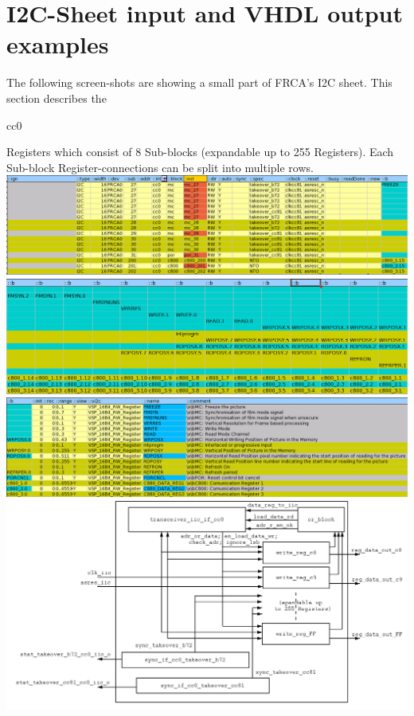 \documentclass[a4paper,12pt]{report}
\begin{document}
\section{I2C-Sheet input and VHDL output examples}
The following screen-shots are showing a small part of  FRCA's I2C sheet. This section describes the \begin{tt}cc0\end{tt} Registers which consist of 8 Sub-blocks (expandable up to 255 Registers). Each Sub-block Register-connections can be split into multiple rows.\newline
\newline
\includegraphics[scale=0.43]{images/FRCA_iic_part0.png}\newline
\newline
\includegraphics[scale=0.45]{images/FRCA_iic_part1.png}\newline
\newline
\includegraphics[scale=0.43]{images/FRCA_iic_part2.png}\newline
\newline
\includegraphics[scale=0.4]{images/serial_iic_reg.png}\newline
\end{document}
